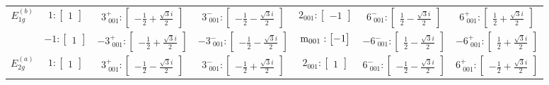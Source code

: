 \documentclass[fleqn,8pt,landscape]{jsarticle}
\begin{document}
\begin{longtable}{ccccccc}
$ E_{1g}^{(b)} $ & $ 1:\begin{bmatrix} 1 \end{bmatrix} $ & $ 3^{+}_{\,\,001}:\begin{bmatrix} - \frac{1}{2} + \frac{\sqrt{3} i}{2} \end{bmatrix} $ & $ 3^{-}_{\,\,001}:\begin{bmatrix} - \frac{1}{2} - \frac{\sqrt{3} i}{2} \end{bmatrix} $ & $ 2{}_{001}:\begin{bmatrix} -1 \end{bmatrix} $ & $ 6^{-}_{\,\,001}:\begin{bmatrix} \frac{1}{2} - \frac{\sqrt{3} i}{2} \end{bmatrix} $ & $ 6^{+}_{\,\,001}:\begin{bmatrix} \frac{1}{2} + \frac{\sqrt{3} i}{2} \end{bmatrix} $ \\
& $ -1:\begin{bmatrix} 1 \end{bmatrix} $ & $ -3^{+}_{\,\,001}:\begin{bmatrix} - \frac{1}{2} + \frac{\sqrt{3} i}{2} \end{bmatrix} $ & $ -3^{-}_{\,\,001}:\begin{bmatrix} - \frac{1}{2} - \frac{\sqrt{3} i}{2} \end{bmatrix} $ & $ {\rm m}_{001}:\begin{bmatrix} -1 \end{bmatrix} $ & $ -6^{-}_{\,\,001}:\begin{bmatrix} \frac{1}{2} - \frac{\sqrt{3} i}{2} \end{bmatrix} $ & $ -6^{+}_{\,\,001}:\begin{bmatrix} \frac{1}{2} + \frac{\sqrt{3} i}{2} \end{bmatrix} $ \\ \hline
$ E_{2g}^{(a)} $ & $ 1:\begin{bmatrix} 1 \end{bmatrix} $ & $ 3^{+}_{\,\,001}:\begin{bmatrix} - \frac{1}{2} - \frac{\sqrt{3} i}{2} \end{bmatrix} $ & $ 3^{-}_{\,\,001}:\begin{bmatrix} - \frac{1}{2} + \frac{\sqrt{3} i}{2} \end{bmatrix} $ & $ 2{}_{001}:\begin{bmatrix} 1 \end{bmatrix} $ & $ 6^{-}_{\,\,001}:\begin{bmatrix} - \frac{1}{2} - \frac{\sqrt{3} i}{2} \end{bmatrix} $ & $ 6^{+}_{\,\,001}:\begin{bmatrix} - \frac{1}{2} + \frac{\sqrt{3} i}{2} \end{bmatrix} $ \\

\end{longtable}
\end{document}
